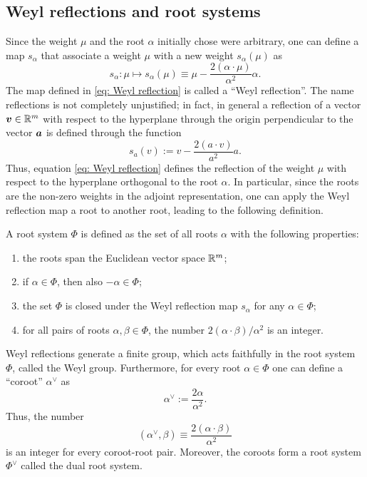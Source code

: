 \subsection{Weyl reflections and root systems}
Since the weight $\mu$ and the root $\alpha$ initially chose were arbitrary, one can define a map $s_\alpha$ that associate a weight $\mu$ with a new weight $s_\alpha(\mu)$ as
\begin{equation}
\label{eq: Weyl reflection}
    s_\alpha : \mu \mapsto s_\alpha(\mu) \equiv \mu - \frac{2(\alpha \cdot \mu)}{\alpha^2}\alpha.
\end{equation}
The map defined in \eqref{eq: Weyl reflection} is called a ``Weyl reflection''. The name reflections is not completely unjustified; in fact, in general a reflection of a vector $\bm{v} \in \mathbb{R}^m$ with respect to the hyperplane through the origin perpendicular to the vector $\bm{a}$ is defined through the function
\begin{equation}
    s_a(v) := v - \frac{2(a \cdot v)}{a^2}a.
\end{equation}
Thus, equation \eqref{eq: Weyl reflection} defines the reflection of the weight $\mu$ with respect to the hyperplane orthogonal to the root $\alpha$. In particular, since the roots are the non-zero weights in the adjoint representation, one can apply the Weyl reflection map a root to another root, leading to the following definition.
\begin{defn}
    A root system $\Phi$ is defined as the set of all roots $\alpha$ with the following properties:
    \begin{enumerate}
        \item the roots span the Euclidean vector space $\mathbb{R}^m$;
        \item if $\alpha \in \Phi$, then also $-\alpha \in \Phi$;
        \item the set $\Phi$ is closed under the Weyl reflection map $s_\alpha$ for any $\alpha \in \Phi$;
        \item for all pairs of roots $\alpha,\beta \in \Phi$, the number $2(\alpha \cdot \beta)/\alpha^2$ is an integer.
    \end{enumerate}
\end{defn}
Weyl reflections generate a finite group, which acts faithfully in the root system $\Phi$, called the Weyl group. Furthermore, for every root $\alpha \in \Phi$ one can define a ``coroot'' $\alpha^\vee$ as
\begin{equation}
\label{eq: coroot definition}
    \alpha^\vee := \frac{2\alpha}{\alpha^2}.
\end{equation}
Thus, the number
\begin{equation}
    (\alpha^\vee,\beta) \equiv \frac{2(\alpha \cdot \beta)}{\alpha^2}
\end{equation}
is an integer for every coroot-root pair. Moreover, the coroots form a root system $\Phi^\vee$ called the dual root system.

